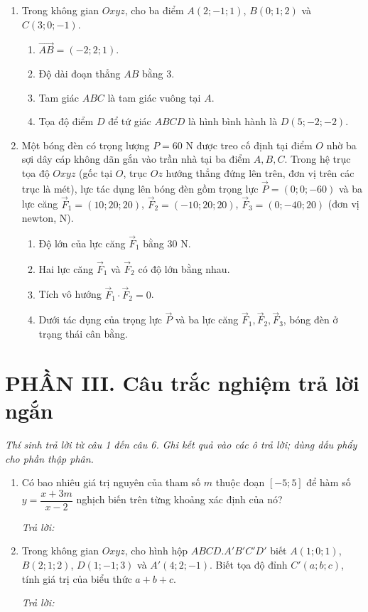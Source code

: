 \documentclass[12pt,a4paper]{article}
\newcommand{\otraloi}{\par\nobreak\smallskip\noindent\textit{Trả lời:}\quad\fbox{\rule{0pt}{11pt}\makebox[0.3cm]{}}\,\fbox{\rule{0pt}{11pt}\makebox[0.3cm]{}}\,\fbox{\rule{0pt}{11pt}\makebox[0.3cm]{}}\,\fbox{\rule{0pt}{11pt}\makebox[0.3cm]{}}}
\begin{document}
\begin{enumerate}[start=3]
\item Trong không gian $Oxyz$, cho ba điểm $A(2;-1;1)$, $B(0;1;2)$ và $C(3;0;-1)$.
\begin{enumerate}
\item $\overrightarrow{AB}=(-2;2;1)$.
\item Độ dài đoạn thẳng $AB$ bằng $3$.
\item Tam giác $ABC$ là tam giác vuông tại $A$.
\item Tọa độ điểm $D$ để tứ giác $ABCD$ là hình bình hành là $D(5;-2;-2)$.
\end{enumerate}

\item Một bóng đèn có trọng lượng $P=60\text{ N}$ được treo cố định tại điểm $O$ nhờ ba sợi dây cáp không dãn gắn vào trần nhà tại ba điểm $A,B,C$. Trong hệ trục tọa độ $Oxyz$ (gốc tại $O$, trục $Oz$ hướng thẳng đứng lên trên, đơn vị trên các trục là mét), lực tác dụng lên bóng đèn gồm trọng lực $\vec P=(0;0;-60)$ và ba lực căng $\vec F_1=(10;20;20)$, $\vec F_2=(-10;20;20)$, $\vec F_3=(0;-40;20)$ (đơn vị newton, N).
\begin{enumerate}
\item Độ lớn của lực căng $\vec F_1$ bằng $30\text{ N}$.
\item Hai lực căng $\vec F_1$ và $\vec F_2$ có độ lớn bằng nhau.
\item Tích vô hướng $\vec F_1\cdot\vec F_2=0$.
\item Dưới tác dụng của trọng lực $\vec P$ và ba lực căng $\vec F_1,\vec F_2,\vec F_3$, bóng đèn ở trạng thái cân bằng.
\end{enumerate}
\end{enumerate}

\section*{\large PHẦN III. Câu trắc nghiệm trả lời ngắn}
\textit{Thí sinh trả lời từ câu 1 đến câu 6. Ghi kết quả vào các ô trả lời; dùng dấu phẩy cho phần thập phân.}
\begin{enumerate}
\item Có bao nhiêu giá trị nguyên của tham số $m$ thuộc đoạn $[-5;5]$ để hàm số
$y=\dfrac{x+3m}{x-2}$ nghịch biến trên từng khoảng xác định của nó?
\otraloi

\item Trong không gian $Oxyz$, cho hình hộp $ABCD.A'B'C'D'$ biết
$A(1;0;1)$, $B(2;1;2)$, $D(1;-1;3)$ và $A'(4;2;-1)$.
Biết tọa độ đỉnh $C'(a;b;c)$, tính giá trị của biểu thức $a+b+c$.
\otraloi
\end{enumerate}
\end{document}
